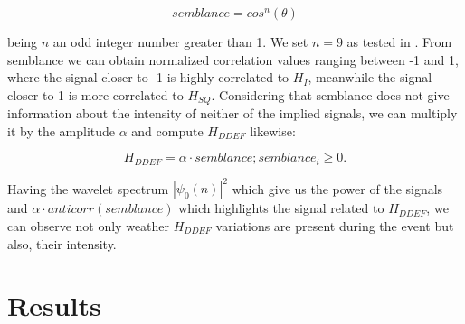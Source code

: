 \documentclass[a4paper]{article}
\theoremstyle{plain}
\theoremstyle{definition}
\begin{document}
	\begin{equation}
		semblance = cos ^n(\theta)
	\end{equation}
	
	\noindent being $n$ an odd integer number greater than 1. We set $n=9$ as tested in \cite{cooper_semblance}. From semblance we can obtain normalized correlation values ranging between -1 and 1, where the signal closer to -1 is  highly correlated to $H_I$, meanwhile the signal closer to 1 is more correlated to $H_{SQ}$. Considering that semblance does not give information about the intensity of neither of the implied signals, we can multiply it by the amplitude $\alpha$ and compute $H_{DDEF}$ likewise:
	
	\begin{equation}
		\label{eq:ddyn}
		H_{DDEF} = \alpha \cdot semblance; semblance_i \geq 0.
	\end{equation}
	
	 Having the wavelet spectrum $|\psi_0(n)|^2$ which give us the power of the signals and $\alpha \cdot anticorr(semblance)$ which highlights the signal related to $H_{DDEF}$, we can observe not only weather $H_{DDEF}$ variations are present during the event but also, their intensity. 
	
	\section{Results}
	\label{sec:prev-results}
\end{document}
